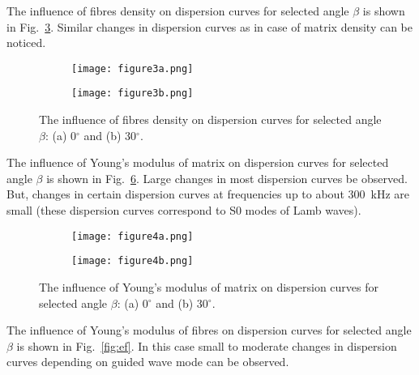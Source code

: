 The influence of fibres density on dispersion curves for selected angle \(\beta\) is 
shown 
in Fig.~\ref{fig:rhof}. Similar changes in dispersion curves as in case of matrix density 
can be noticed.


\begin{figure} [h!]
	\centering
	\begin{subfigure}[b]{0.49\textwidth}
		\centering
							\texttt{[image: figure3a.png]}
		\caption{}
		\label{fig:rhof0}
	\end{subfigure}
	\hfill
	\begin{subfigure}[b]{0.49\textwidth}
		\centering
								\texttt{[image: figure3b.png]}
		\caption{}
		\label{fig:rhof30}
	\end{subfigure}
	
\caption{The influence of fibres density on dispersion curves for selected angle 
	\(\beta\): (a) 0\(^{\circ}\) and (b) 30\(^{\circ}\).}
 
	\label{fig:rhof}
\end{figure}

The influence of Young's modulus of matrix on dispersion curves for selected angle 
\(\beta\) is shown in Fig.~\ref{fig:em}. Large changes in most dispersion curves  be 
observed. But, changes in certain dispersion curves at frequencies up to about 
300~kHz are small (these dispersion curves correspond to S0 modes of Lamb waves).


\begin{figure} [h!]
	\centering
	\begin{subfigure}[b]{0.49\textwidth}
		\centering
							\texttt{[image: figure4a.png]}
		\caption{}
		\label{fig:em0}
	\end{subfigure}
	\hfill
	\begin{subfigure}[b]{0.49\textwidth}
		\centering
								\texttt{[image: figure4b.png]}
		\caption{}
		\label{fig:em30}
	\end{subfigure}
	
\caption{The influence of Young's modulus of matrix  on dispersion curves for 
	selected angle \(\beta\): (a) 0\(^{\circ}\) and (b) 30\(^{\circ}\).}
 
	\label{fig:em}
\end{figure}

The influence of Young's modulus of fibres on dispersion curves for selected angle 
\(\beta\) is shown in Fig.~\ref{fig:ef}. In this case small to moderate changes in 
dispersion curves depending on guided wave mode can be observed. 


